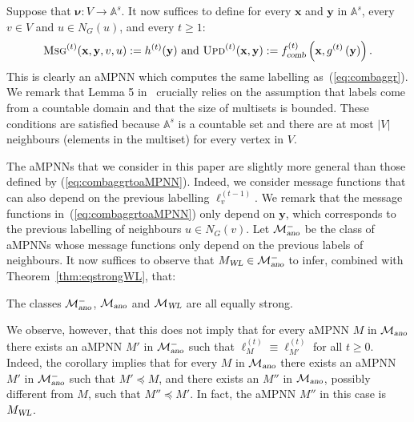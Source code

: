 Suppose that
$\pmb{\nu}:V\to\mathbb{A}^s$. It now suffices to define for every $\mathbf{x}$ and $\mathbf{y}$ in $\mathbb{A}^s$, every $v\in V$ and $u\in N_G(u)$, and every $t\geq 1$:
\begin{equation}
\textsc{Msg}^{(t)}(\mathbf{x},\mathbf{y},v,u):=h^{(t)}(\mathbf{y}) \text{ and } \textsc{Upd}^{(t)}(\mathbf{x},\mathbf{y}):=f_{\textsl{comb}}^{(t)}\left(\mathbf{x},g^{(t)}\left(\mathbf{y}\right)\right).\label{eq:combaggrtoaMPNN}
\end{equation}
This is clearly an aMPNN which computes the same labelling as~(\ref{eq:combaggr}). We remark that
Lemma 5 in~\cite{xhlj19} crucially relies on the assumption that labels come from a countable domain
and that the size of multisets is bounded. These conditions are satisfied because $\mathbb{A}^s$ is a countable set and there are at most $|V|$ neighbours (elements in the multiset) for every vertex in $V$.

The aMPNNs that we consider in this paper are slightly more general than those defined by
(\ref{eq:combaggrtoaMPNN}). Indeed, we consider message functions that can also depend on the previous labelling $\pmb{\ell}_v^{(t-1)}$. We remark that the message functions in~(\ref{eq:combaggrtoaMPNN}) only depend on $\mathbf{y}$, which corresponds to the previous labelling of neighbours $u\in N_G(v)$. Let $\mathcal{M}{}^{-}_{\textsl{ano}}$ be the class of aMPNNs whose message functions only
depend on the previous labels of neighbours. It now suffices to observe that
 $M_{\textsl{WL}}\in \mathcal{M}{}^{-}_{\textsl{ano}}$ to infer,  combined with Theorem~\ref{thm:eqstrongWL}, that:
 \begin{corollary}
	 The classes $\mathcal{M}{}^{-}_{\textsl{ano}}$, $\mathcal{M}_{\textsl{ano}}$ and $\mathcal{M}_{\textsl{WL}}$ are all equally strong.
 \end{corollary}
We observe, however, that this does not imply that for every aMPNN $M$ in $\mathcal{M}_{\textsl{ano}}$ there exists an aMPNN $M'$ in $\mathcal{M}{}^{-}_{\textsl{ano}}$
such that $\pmb{\ell}_{M}^{(t)}\equiv \pmb{\ell}_{M'}^{(t)}$ for all $t\geq 0$.
Indeed, the corollary implies that for every $M$ in $\mathcal{M}_{\textsl{ano}}$ there exists an aMPNN $M'$ in $\mathcal{M}{}^{-}_{\textsl{ano}}$ such that $M'\preceq M$, and there exists an $M''$ in $\mathcal{M}_{\textsl{ano}}$, possibly different from $M$, such that $M''\preceq M'$. In fact, the aMPNN $M''$ in this case is $M_{\textsl{WL}}$.


